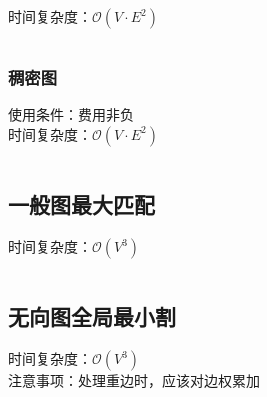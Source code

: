 \documentclass[landscape, twoside, a4paper]{article}
\newcommand{\cppcode}[1]{
	\inputminted[mathescape,
	frame=lines,linenos]{cpp}{source/#1}
}
\begin{document}
\begin{multicols}{2}
\begin{spacing}{0.8}
时间复杂度：$\mathcal{O}(V \cdot E^2)$


\cppcode{graph-theory/minimum-cost-flow-spfa.cpp}


\subsubsection{稠密图}


使用条件：费用非负\\

\indent 时间复杂度：$\mathcal{O}(V \cdot E^2)$


\cppcode{graph-theory/minimum-cost-flow-zkw.cpp}


\subsection{一般图最大匹配}


时间复杂度：$\mathcal{O}(V^3)$


\cppcode{graph-theory/maximum-matching-blossom.cpp}


\subsection{无向图全局最小割}


时间复杂度：$\mathcal{O}(V^3)$\\

\indent 注意事项：处理重边时，应该对边权累加


\cppcode{graph-theory/minimum-cut-stoer-wagner.cpp}















\end{spacing}
\end{multicols}
\end{document}
